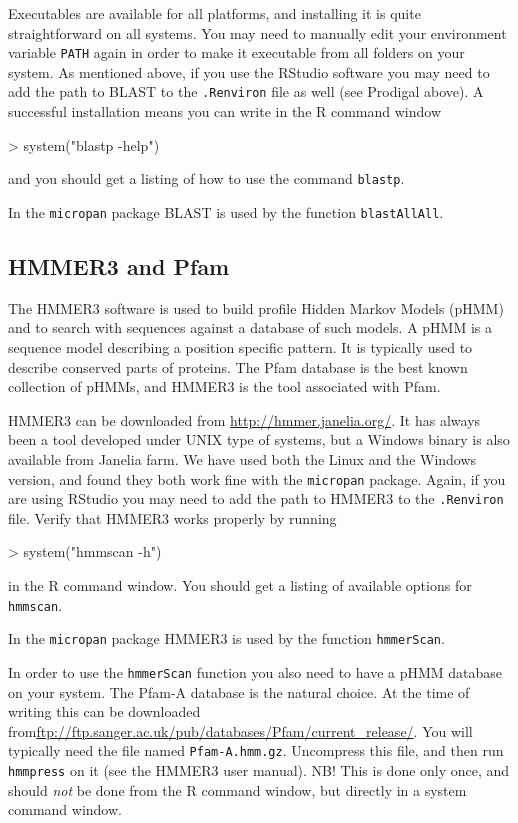 \documentclass{article}
\begin{document}
Executables are available for all platforms, and installing it is quite straightforward on all systems. You may need to manually edit your environment variable \texttt{PATH} again in order to make it executable from all folders on your system. As mentioned above, if you use the RStudio software you may need to add the path to BLAST to the \texttt{.Renviron} file as well (see Prodigal above). A successful installation means you can write in the R command window
\begin{Schunk}
\begin{Sinput}
> system("blastp -help")
\end{Sinput}
\end{Schunk}
and you should get a listing of how to use the command \texttt{blastp}. 

In the \texttt{micropan} package BLAST is used by the function \texttt{blastAllAll}.


\subsection{HMMER3 and Pfam}
The HMMER3 software is used to build profile Hidden Markov Models (pHMM) and to search with sequences against a database of such models. A pHMM is a sequence model describing a position specific pattern. It is typically used to describe conserved parts of proteins. The Pfam database is the best known collection of pHMMs, and HMMER3 is the tool associated with Pfam.

HMMER3 can be downloaded from \url{http://hmmer.janelia.org/}. It has always been a tool developed under UNIX type of systems, but a Windows binary is also available from Janelia farm. We have used both the Linux and the Windows version, and found they both work fine with the \texttt{micropan} package. Again, if you are using RStudio you may need to add the path to HMMER3 to the \texttt{.Renviron} file. Verify that HMMER3 works properly by running 
\begin{Schunk}
\begin{Sinput}
> system("hmmscan -h")
\end{Sinput}
\end{Schunk}

in the R command window. You should get a listing of available options for \texttt{hmmscan}.

In the \texttt{micropan} package HMMER3 is used by the function \texttt{hmmerScan}.

In order to use the \texttt{hmmerScan} function you also need to have a pHMM database on your system. The Pfam-A database is the natural choice. At the time of writing this can be downloaded from\newline \url{ftp://ftp.sanger.ac.uk/pub/databases/Pfam/current\_release/}. You will typically need the file named \texttt{Pfam-A.hmm.gz}. Uncompress this file, and then run \texttt{hmmpress} on it (see the HMMER3 user manual). NB! This is done only once, and should \emph{not} be done from the R command window, but directly in a system command window.
\end{document}
